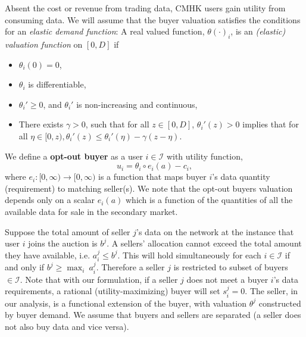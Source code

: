 \documentclass[12pt]{article}
\theoremstyle{definition}
\newcommand{\mcI}{\mathcal{I}}
\begin{document}
\begin{multicols}{2}
Absent the cost or revenue from trading data, CMHK users gain utility from consuming
data. 
We will assume that the buyer valuation satisfies the conditions for an
\emph{elastic demand function}: 
A real valued function, $\theta(\cdot)_i$, is an \emph{(elastic) valuation
function} on $[0, D]$ if 
\begin{itemize}
    \item $\theta_i(0) = 0$,
    \item $\theta_i$ is differentiable,
    \item ${\theta_i}' \ge 0$, and ${\theta_i}'$ is non-increasing and continuous,
     \item There exists $\gamma > 0$, such that for all $z \in [0,D]$,
${\theta_i}'(z) > 0$ implies that for all $\eta \in [0, z), {\theta_i}'(z) \le
{\theta_i}'(\eta)
- \gamma(z - \eta)$. 
\end{itemize}

We define a \textbf{opt-out buyer} as a user $i\in\mcI$ with utility
function,
\begin{equation}\label{buyerutility}
    u_i = \theta_i \circ e_i(a) - c_i,
\end{equation}
where $e_i : [0, \infty) \rightarrow [0,\infty)$ is %
a function that maps buyer $i$'s data quantity (requirement) to matching
seller(s). We note that the opt-out buyers valuation depends only on a scalar $e_i(a)$ which is a function of the
quantities of all the available data for sale in the secondary market. 

Suppose the total amount of seller $j$'s data on the network at the instance that
user $i$ joins the auction is $b^j$. 
A sellers' allocation cannot exceed the total amount they have available,
i.e. $a_i^j \le b^j$. This will hold simultaneously for each $i \in
\mcI$ if and only if $b^j \ge \max_i \ a_i^j$. Therefore a seller $j$ is
restricted to subset of buyers $\in\mcI$.
Note that with our formulation, if a seller $j$ does not meet a buyer $i$'s data requirements, a
rational (utility-maximizing) buyer will set $s_i^j = 0$. The seller, in our analysis, is a functional
extension of the buyer, with valuation $\theta^j$ constructed by buyer demand.
We assume that buyers and sellers are separated (a seller does not also buy
data and vice versa).


\end{multicols}
\end{document}
